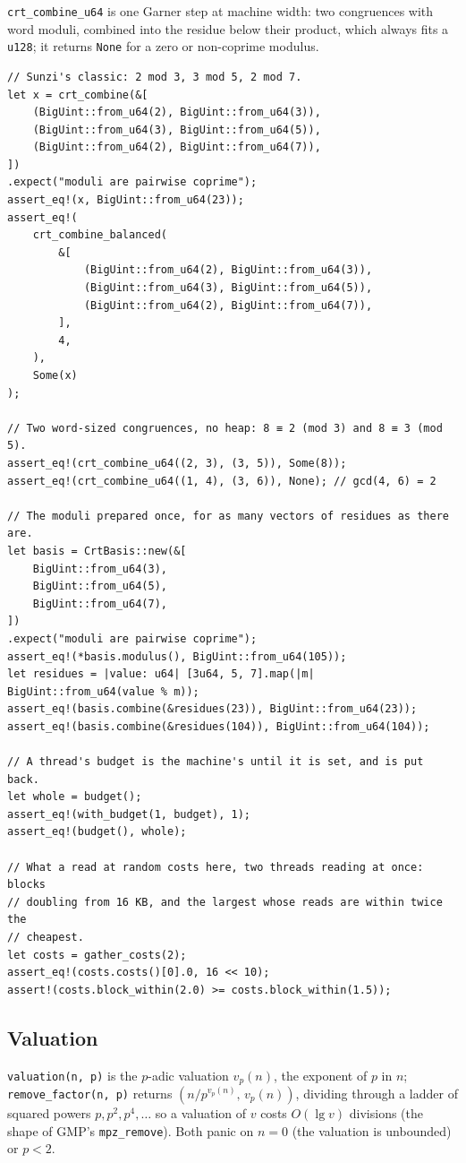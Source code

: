 \documentclass[11pt]{article}
\newcommand{\code}[1]{\texttt{#1}}
\begin{document}
\code{crt\_combine\_u64} is one
Garner step at machine width: two congruences with word moduli, combined into
the residue below their product, which always fits a \code{u128}; it returns
\code{None} for a zero or non-coprime modulus.

\begin{lstlisting}
// Sunzi's classic: 2 mod 3, 3 mod 5, 2 mod 7.
let x = crt_combine(&[
    (BigUint::from_u64(2), BigUint::from_u64(3)),
    (BigUint::from_u64(3), BigUint::from_u64(5)),
    (BigUint::from_u64(2), BigUint::from_u64(7)),
])
.expect("moduli are pairwise coprime");
assert_eq!(x, BigUint::from_u64(23));
assert_eq!(
    crt_combine_balanced(
        &[
            (BigUint::from_u64(2), BigUint::from_u64(3)),
            (BigUint::from_u64(3), BigUint::from_u64(5)),
            (BigUint::from_u64(2), BigUint::from_u64(7)),
        ],
        4,
    ),
    Some(x)
);

// Two word-sized congruences, no heap: 8 ≡ 2 (mod 3) and 8 ≡ 3 (mod 5).
assert_eq!(crt_combine_u64((2, 3), (3, 5)), Some(8));
assert_eq!(crt_combine_u64((1, 4), (3, 6)), None); // gcd(4, 6) = 2

// The moduli prepared once, for as many vectors of residues as there are.
let basis = CrtBasis::new(&[
    BigUint::from_u64(3),
    BigUint::from_u64(5),
    BigUint::from_u64(7),
])
.expect("moduli are pairwise coprime");
assert_eq!(*basis.modulus(), BigUint::from_u64(105));
let residues = |value: u64| [3u64, 5, 7].map(|m| BigUint::from_u64(value % m));
assert_eq!(basis.combine(&residues(23)), BigUint::from_u64(23));
assert_eq!(basis.combine(&residues(104)), BigUint::from_u64(104));

// A thread's budget is the machine's until it is set, and is put back.
let whole = budget();
assert_eq!(with_budget(1, budget), 1);
assert_eq!(budget(), whole);

// What a read at random costs here, two threads reading at once: blocks
// doubling from 16 KB, and the largest whose reads are within twice the
// cheapest.
let costs = gather_costs(2);
assert_eq!(costs.costs()[0].0, 16 << 10);
assert!(costs.block_within(2.0) >= costs.block_within(1.5));
\end{lstlisting}

\subsection{Valuation}

\code{valuation(n, p)} is the $p$-adic valuation $v_p(n)$, the exponent of
$p$ in $n$; \code{remove\_factor(n, p)} returns $(n / p^{v_p(n)},\,
v_p(n))$, dividing through a ladder of squared powers
$p, p^2, p^4, \ldots$ so a valuation of $v$ costs $O(\lg v)$ divisions
(the shape of GMP's \code{mpz\_remove}). Both panic on $n = 0$ (the
valuation is unbounded) or $p < 2$.
\end{document}
